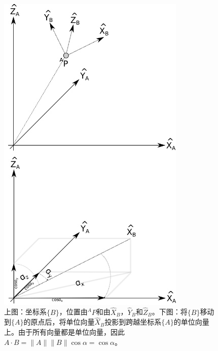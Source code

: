 \begin{figure}
	\centering
	\includegraphics[width=0.8\textwidth]{figs/projection.png}
	\caption{上图：坐标系$\{B\}$，位置由$^AP$和由$\hat{X}_B$，$\hat{Y}_B$和$\hat{Z}_B$。下图：将$\{B\}$移动到$\{A\}$的原点后，将单位向量$\hat{X}_B$投影到跨越坐标系$\{A\}$的单位向量上。由于所有向量都是单位向量，因此$A\cdot B=\|A\|\|B\|\cos\alpha=\cos\alpha$。}
	\label{fig:projection}
\end{figure}


